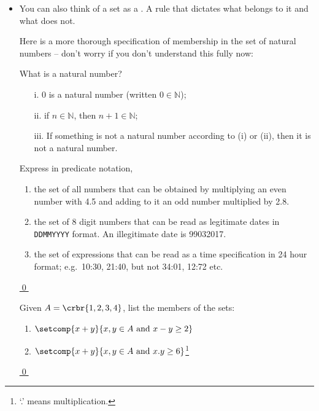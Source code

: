 \documentclass[11pt]{article}
\begin{document}
\begin{itemize}

\item You can also think of a set as a . A rule that dictates what
belongs to it and what does not.

\item[] Here is a more thorough specification of membership in the set of natural
numbers -- don't worry if you don't
understand this fully now:


\hrulefill
\begin{udefinition}{What is a natural number?}
\begin{itemize}
\item[i.] 0 is a natural number (written $0\in\mathbb{N}$);
\item[ii.] if $n\in\mathbb{N}$, then  $n+1\in\mathbb{N}$; 
\item[iii.] If something is not a natural number according to (i) or (ii), then
it is not a natural number.
\end{itemize}
\end{udefinition}
\hrulefill


\hrulefill
\begin{uexercise} \label{expred}
Express in predicate notation,
\begin{enumerate}
\item\label{expreda} the set of all numbers that can be obtained by multiplying an even
number with 4.5 and adding to it an odd number multiplied by 2.8. 
\item\label{expredb} the set of 8 digit numbers that can be read as legitimate dates in
\mbox{\texttt{DDMMYYYY}} format. An illegitimate date is 99032017.
\item\label{expredc} the set of expressions that can be read as a time specification in 24
hour format; e.g.\ 10:30, 21:40, but not 34:01, 12:72 etc.
\end{enumerate}
\hyperlink{expredsol}{\qed}
\end{uexercise}

\begin{uexercise} \label{ex-pred2}
Given $A = \crbr{1,2,3,4}$, list the members of the sets:
\begin{enumerate}
\item\label{ex-pred2-a} $\setcomp{x+y}{x,y\in A \text{ and } x-y \geq 2}$
\item\label{ex-pred2-b} $\setcomp{x+y}{x,y\in A \text{ and } x.y \geq 6}$\footnote{`.' means
multiplication.}
\end{enumerate}
\hyperlink{ex-pred2-sol}{\qed}
\end{uexercise}


\end{itemize}
\end{document}
